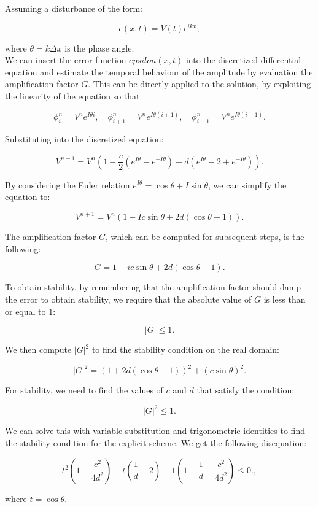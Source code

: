 \documentclass{article}
\begin{document}
Assuming a disturbance of the form:

\[
\epsilon(x, t) = V(t) e^{ikx},
\]

where $\theta = k \Delta x$ is the phase angle.
\\We can insert the error function \(epsilon(x, t)\) into the discretized differential equation and estimate the temporal behaviour of the amplitude by evaluation the amplification factor \(G\). This can be directly applied to the solution, by exploiting the linearity of the equation so that:

\[
\phi_i^n = V^n e^{I \theta i}, \quad \phi_{i+1}^n = V^n e^{I \theta (i+1)}, \quad \phi_{i-1}^n = V^n e^{I \theta (i-1)}.
\]

Substituting into the discretized equation:

\[
V^{n+1} = V^n \left(1 - \frac{c}{2} (e^{I \theta} - e^{-I \theta}) + d (e^{I \theta} - 2 + e^{-I \theta})\right).
\]

By considering the Euler relation \(e^{I \theta} = \cos \theta + I \sin \theta\), we can simplify the equation to:

\[
V^{n+1} = V^n \left(1 - I c \sin \theta + 2d (\cos \theta - 1)\right).
\]

The amplification factor $G$, which can be computed for subsequent steps, is the following:

\[
G = 1 - i c \sin \theta + 2d (\cos \theta - 1).
\]

To obtain stability, by remembering that the amplification factor should damp the error to obtain stability, we require that the absolute value of $G$ is less than or equal to 1:

\[
|G| \leq 1.
\]

We then compute $|G|^2$ to find the stability condition on the real domain:

\[
|G|^2 = \left(1 + 2d (\cos \theta - 1)\right)^2 + (c \sin \theta)^2.
\]

For stability, we need to find the values of $c$ and $d$ that satisfy the condition:

\[
|G|^2 \leq 1.
\]

We can solve this with variable substitution and trigonometric identities to find the stability condition for the explicit scheme.
We get the following disequation:

\[
t^2(1-\frac{c^2}{4d^2}) + t(\frac{1}{d}-2) + 1 (1-\frac{1}{d}+\frac{c^2}{4d^2}) \leq 0.,
\]

where \(t = \cos \theta\).
\end{document}
